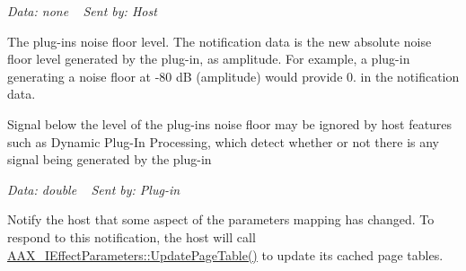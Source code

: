 \begin{Desc}
\begin{description}
{\itshape Data\+: none} ~\newline
 {\itshape Sent by\+: Host} \item[{\em 
\hypertarget{a00206_afab5ea2cfd731fc8f163b6caa685406eade0750c56040f18da04cf5de184c908e}{}A\+A\+X\+\_\+e\+Notification\+Event\+\_\+\+Noise\+Floor\+Changed\label{a00206_afab5ea2cfd731fc8f163b6caa685406eade0750c56040f18da04cf5de184c908e}
}]The plug-\/in\textquotesingle{}s noise floor level. The notification data is the new absolute noise floor level generated by the plug-\/in, as amplitude. For example, a plug-\/in generating a noise floor at -\/80 d\+B (amplitude) would provide 0. in the notification data.

Signal below the level of the plug-\/in\textquotesingle{}s noise floor may be ignored by host features such as Dynamic Plug-\/\+In Processing, which detect whether or not there is any signal being generated by the plug-\/in

{\itshape Data\+: {\ttfamily double}} ~\newline
 {\itshape Sent by\+: Plug-\/in} \item[{\em 
\hypertarget{a00206_afab5ea2cfd731fc8f163b6caa685406ea92f2ef0cec96b2654789e708d1a1b5e3}{}A\+A\+X\+\_\+e\+Notification\+Event\+\_\+\+Parameter\+Mapping\+Changed\label{a00206_afab5ea2cfd731fc8f163b6caa685406ea92f2ef0cec96b2654789e708d1a1b5e3}
}]Notify the host that some aspect of the parameters\textquotesingle{} mapping has changed. To respond to this notification, the host will call \hyperlink{a00064_a4cdb043ffbdca6f6c4a7e9a96a4347a2}{A\+A\+X\+\_\+\+I\+Effect\+Parameters\+::\+Update\+Page\+Table()} to update its cached page tables.


\end{description}
\end{Desc}
